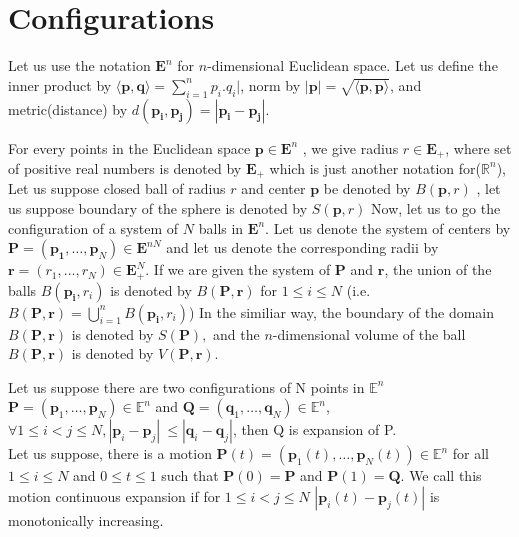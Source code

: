 
\section{Configurations}
Let us use the notation $\mathbf{E}^{n}$ for $n$-dimensional Euclidean space. Let us define the inner product by $\langle\mathbf{p} , \mathbf{q}\rangle =\sum_{i=1}^{n} p_{i}. q_{i}|$, norm by   $|\mathbf{p}|=\sqrt{\langle\mathbf{p}, \mathbf{p}\rangle}$, and metric(distance) by $d(\mathbf{p_i}, \mathbf{p_j})=|\mathbf{p_i}-\mathbf{p_j}|$.

For every points in the Euclidean space $\mathbf{p} \in \mathbf{E}^{n}$ , we give radius $r \in \mathbf{E}_{+}$, where set of positive real numbers is denoted by $\mathbf{E}_{+}$ which is just another notation for($\mathbb{R}^n$), Let us suppose  closed ball of radius $r$ and center $\mathbf{p}$ be denoted by $B(\mathbf{p}, r)$ , let us suppose boundary of the sphere is denoted by $S(\mathbf{p}, r)$
Now, let us to go the configuration of a system of $N$ balls in $\mathbf{E}^{n}$. Let us denote the system of centers by $\mathbf{P}=\left(\mathbf{p}_{\mathbf{1}}, \ldots, \mathbf{p}_{N}\right) \in \mathbf{E}^{n N}$ and let us denote the corresponding radii by $\mathbf{r}=\left(r_{1}, \ldots, r_{N}\right) \in \mathbf{E}_{+}^{N}$. If we are given the system of $\mathbf{P}$ and $\mathbf{r}$,    the union of the balls $B\left(\mathbf{p}_{\mathbf{i}}, r_{i}\right)$ is denoted by $B(\mathbf{P}, \mathbf{r})$ for $1 \leq i \leq N$ (i.e. $B(\mathbf{P}, \mathbf{r}) =\bigcup_{i=1}^{n} B\left(\mathbf{p}_{\mathbf{i}}, r_{i}\right)$) In the similiar way, the boundary of the domain $B(\mathbf{P}, \mathbf{r})$ is denoted by $S(\mathbf{P}), $ and the $n$-dimensional volume of the ball $B(\mathbf{P}, \mathbf{r})$ is denoted by $V(\mathbf{P}, \mathbf{r})$. 




Let us suppose there are two configurations of N points in  $\mathbb{E}^n$ $ \boldsymbol{P}=\left(\boldsymbol{p}_{1}, \ldots, \boldsymbol{p}_{N}\right) \in \mathbb{E}^{n}$ and $\boldsymbol{Q}=\left(\boldsymbol{q}_{1}, \ldots, \boldsymbol{q}_{N}\right) \in \mathbb{E}^{n}$, $\forall 1\leq i < j \leq N,  \left|\boldsymbol{p}_{i}-\boldsymbol{p}_{j}\right|\ \leq \left|\boldsymbol{q}_{i}-\boldsymbol{q}_{j}\right|$, then Q is expansion of P. \\
Let us suppose, there is a motion $\boldsymbol{P}(t)=\left(\boldsymbol{p}_{1}(t), \ldots, \boldsymbol{p}_{N}(t)\right) \in \mathbb{E}^{n}$ for all $1 \leq i \leq N$ and $0 \leq t \leq 1$ such that $\boldsymbol{P}(0)=\boldsymbol{P}$ and $\boldsymbol{P}(1)=\boldsymbol{Q}$. We call this motion continuous expansion if for $1 \leq i<j \leq N$ $\left|\boldsymbol{p}_{i}(t)-\boldsymbol{p}_{j}(t)\right|$ is monotonically increasing.\\


